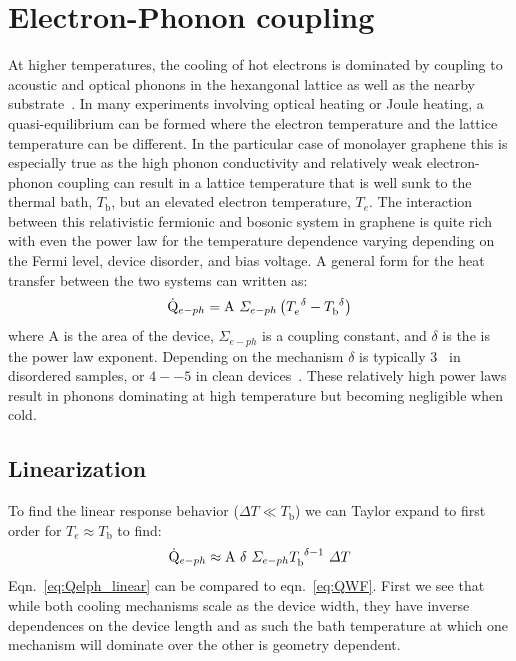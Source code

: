 \section{Electron-Phonon coupling}
\label{section:elph}
At higher temperatures, the cooling of hot electrons is dominated by coupling to acoustic and optical phonons in the hexangonal lattice as well as the nearby substrate~\cite{viljas_electron-phonon_2010,bistritzer_electronic_2009}. In many experiments involving optical heating or Joule heating, a quasi-equilibrium can be formed where the electron temperature and the lattice temperature can be different. In the particular case of monolayer graphene this is especially true as the high phonon conductivity and relatively weak electron-phonon coupling can result in a lattice temperature that is well sunk to the thermal bath, $T_\mathrm{b}$, but an elevated electron temperature, $T_e$. The interaction between this relativistic fermionic and bosonic system in graphene is quite rich with even the power law for the temperature dependence varying depending on the Fermi level, device disorder, and bias voltage. A general form for the heat transfer between the two systems can written as:
\begin{equation}\label{eq:Qelph}
\dot{\mathrm{Q}}_{e-ph}=\mathrm{A}~\Sigma_{e-ph}\left( T_e^{~\delta} - T_\mathrm{b}^{~\delta} \right)
\end{equation}
where $\mathrm{A}$ is the area of the device, $\Sigma_{e-ph}$ is a coupling constant, and $\delta$ is the is the power law exponent. Depending on the mechanism $\delta$ is typically $3$~\cite{song_disorder-assisted_2012, chen_electron-phonon_2012} in disordered samples,  or $4--5$ in clean devices~\cite{viljas_electron-phonon_2010, bistritzer_electronic_2009}. These relatively high power laws result in phonons dominating at high temperature but becoming negligible when cold.
\subsection{Linearization}
To find the linear response behavior ($\Delta T \ll T_\mathrm{b}$) we can Taylor expand to first order for $T_e\approx T_\mathrm{b}$ to find:
\begin{equation}\label{eq:Qelph_linear}
\dot{\mathrm{Q}}_{e-ph} \approx \mathrm{A}~\delta~\Sigma_{e-ph}T_\mathrm{b}^{~\delta-1}~\Delta T
\end{equation}
Eqn.~\ref{eq:Qelph_linear} can be compared to eqn.~\ref{eq:QWF}. First we see that while both cooling mechanisms scale as the device width, they have inverse dependences on the device length and as such the bath temperature at which one mechanism will dominate over the other is geometry dependent.

